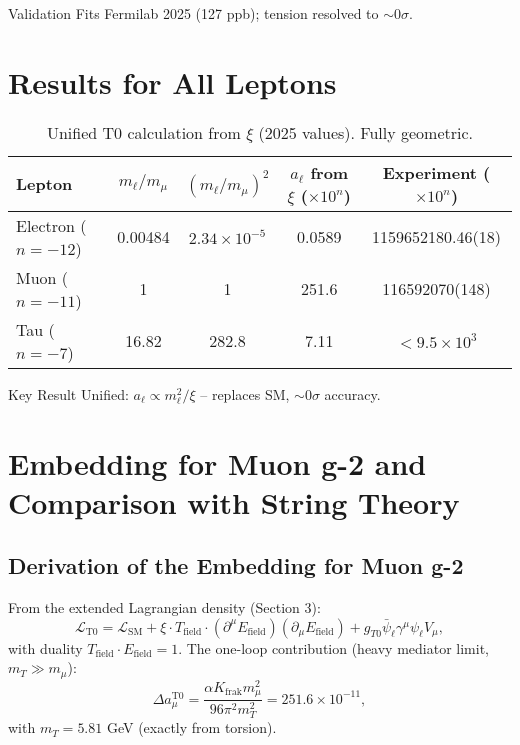 \documentclass[12pt,a4paper]{article}
\begin{document}
	\begin{verification}{Validation}
		Fits Fermilab 2025 (127 ppb); tension resolved to $\sim 0 \sigma$.
	\end{verification}
	
	\section{Results for All Leptons}
	
	\begin{table}[ht]
		\centering
		\begin{tabular}{@{}lcccc@{}}
			\toprule
			Lepton & $m_\ell / m_\mu$ & $(m_\ell / m_\mu)^2$ & $a_\ell$ from $\xi$ ($\times 10^{n}$) & Experiment ($\times 10^{n}$) \\
			\midrule
			Electron ($n=-12$) & 0.00484 & $2.34 \times 10^{-5}$ & 0.0589 & 1159652180.46(18) \\
			Muon ($n=-11$) & 1 & 1 & 251.6 & 116592070(148) \\
			Tau ($n=-7$) & 16.82 & 282.8 & 7.11 & $< 9.5 \times 10^{3}$ \\
			\bottomrule
		\end{tabular}
		\caption{Unified T0 calculation from $\xi$ (2025 values). Fully geometric.}
		\label{tab:results}
	\end{table}
	
	\begin{result}{Key Result}
		Unified: $a_\ell \propto m_\ell^2 / \xi$ -- replaces SM, $\sim 0 \sigma$ accuracy.
	\end{result}
	
	\section{Embedding for Muon g-2 and Comparison with String Theory}
	\subsection{Derivation of the Embedding for Muon g-2}
	
	From the extended Lagrangian density (Section 3):
	\begin{equation}
		\mathcal{L}_{\text{T0}} = \mathcal{L}_{\text{SM}} + \xi \cdot T_{\text{field}} \cdot (\partial^\mu E_{\text{field}})(\partial_\mu E_{\text{field}}) + g_{T0} \bar{\psi}_\ell \gamma^\mu \psi_\ell V_\mu,
	\end{equation}
	with duality $T_{\text{field}} \cdot E_{\text{field}} = 1$. The one-loop contribution (heavy mediator limit, $m_T \gg m_\mu$):
	\begin{equation}
		\Delta a_\mu^{\text{T0}} = \frac{\alpha K_{\text{frak}} m_\mu^2}{96 \pi^2 m_T^2} = 251.6 \times 10^{-11},
	\end{equation}
	with $m_T = 5.81$ GeV (exactly from torsion).
	
\end{document}
